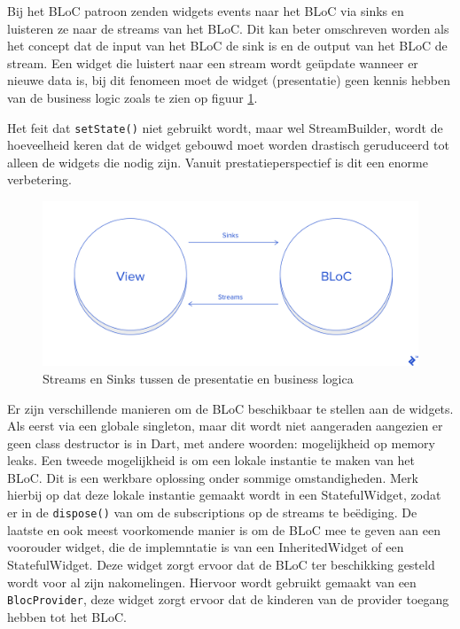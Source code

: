 Bij het BLoC patroon zenden widgets events naar het BLoC via sinks en luisteren ze naar de streams van het BLoC.
Dit kan beter omschreven worden als het concept dat de input van het BLoC de sink is en de output van het BLoC de stream. Een widget die luistert naar een stream wordt geüpdate wanneer er nieuwe data is, bij dit fenomeen moet de widget (presentatie) geen kennis hebben van de business logic zoals te zien op figuur \ref{fig:bloc-pattern-streams-sinks}. 

Het feit dat \verb|setState()| niet gebruikt wordt, maar wel StreamBuilder, wordt de hoeveelheid keren dat de widget gebouwd moet worden drastisch geruduceerd tot alleen de widgets die nodig zijn.
Vanuit prestatieperspectief is dit een enorme verbetering.

\begin{figure}[H]
    \centering
    \includegraphics[width=\linewidth]{img/stand-van-zaken/bloc-pattern-streams-sinks.png}
    \caption{Streams en Sinks tussen de presentatie en business logica \autocite{Perutovic2018}}
    \label{fig:bloc-pattern-streams-sinks}
\end{figure}

Er zijn verschillende manieren om de BLoC beschikbaar te stellen aan de widgets. Als eerst via een globale singleton, maar dit wordt niet aangeraden aangezien er geen class destructor is in Dart, met andere woorden: mogelijkheid op memory leaks.
Een tweede mogelijkheid is om een lokale instantie te maken van het BLoC. Dit is een werkbare oplossing onder sommige omstandigheden. Merk hierbij op dat deze lokale instantie gemaakt wordt in een StatefulWidget, zodat er in de \verb|dispose()| van om de subscriptions op de streams te beëdiging.
De laatste en ook meest voorkomende manier is om de BLoC mee te geven aan een voorouder widget, die de implemntatie is van een InheritedWidget of een StatefulWidget.  Deze widget zorgt ervoor dat de BLoC ter beschikking gesteld wordt voor al zijn nakomelingen. Hiervoor wordt gebruikt gemaakt van een \verb|BlocProvider|, deze widget zorgt ervoor dat de kinderen van de provider toegang hebben tot het BLoC.

